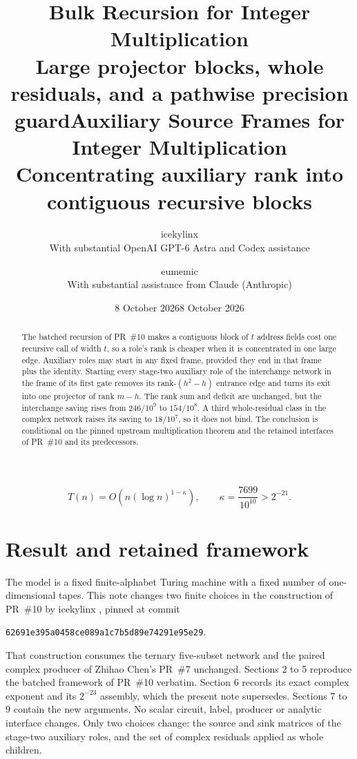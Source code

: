 \documentclass[11pt]{article}
\title{Bulk Recursion for Integer Multiplication\\[4pt]
  \large Large projector blocks, whole residuals, and a pathwise precision guard}
\author{icekylinx\\\small With substantial OpenAI GPT-6 Astra and Codex assistance}
\date{8 October 2026}
\numberwithin{equation}{section}
\begin{document}
\title{Auxiliary Source Frames for Integer Multiplication\\[4pt]
  \large Concentrating auxiliary rank into contiguous recursive blocks}
\author{eumemic\\\small With substantial assistance from Claude (Anthropic)}
\date{8 October 2026}
\maketitle
\begin{abstract}
The batched recursion of PR~\#10 makes a contiguous block of $t$ address
fields cost one recursive call of width $t$, so a role's rank is cheaper
when it is concentrated in one large edge. Auxiliary roles may start in any
fixed frame, provided they end in that frame plus the identity. Starting
every stage-two auxiliary role of the interchange network in the frame of
its first gate removes its rank-$(h^2-h)$ entrance edge and turns its exit
into one projector of rank $m-h$. The rank sum and deficit are unchanged,
but the interchange saving rises from $246/10^9$ to $154/10^8$. A third
whole-residual class in the complex network raises its saving to
$18/10^7$, so it does not bind. The conclusion is conditional on the
pinned upstream multiplication theorem and the retained interfaces of
PR~\#10 and its predecessors.
\end{abstract}
\vspace{1.5em}
\[
\boxed{T(n)=O\!\left(n(\log n)^{1-\kappa}\right),\qquad
\kappa=\frac{7699}{10^{10}}>2^{-21}.}
\]
\clearpage
\tableofcontents
\clearpage

\section{Result and retained framework}
The model is a fixed finite-alphabet Turing machine with a fixed number of
one-dimensional tapes. This note changes two finite choices in the
construction of PR~\#10 by icekylinx \cite{pr10}, pinned at commit
\begin{center}
\texttt{62691e395a0458ce089a1c7b5d89e74291e95e29}.
\end{center}
That construction consumes the ternary five-subset network and the paired
complex producer of Zhihao Chen's PR~\#7 \cite{pr7} unchanged. Sections 2
to 5 reproduce the batched framework of PR~\#10 verbatim. Section 6 records
its exact complex exponent and its $2^{-23}$ assembly, which the present
note supersedes. Sections 7 to 9 contain the new arguments. No scalar
circuit, label, producer or analytic interface changes. Only two choices
change: the source and sink matrices of the stage-two auxiliary roles, and
the set of complex residuals applied as whole children.
\end{document}
